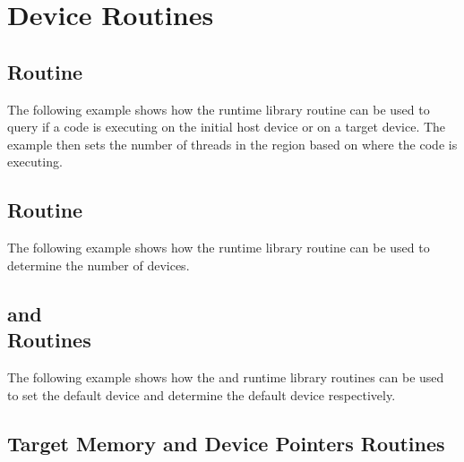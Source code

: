 \pagebreak
\section{Device Routines}
\label{sec:device}

\subsection{ Routine}
\label{subsec:device_is_initial}

The following example shows how the  runtime library routine 
can be used to query if a code is executing on the initial host device or on a 
target device. The example then sets the number of threads in the  
region based on where the code is executing.



\subsection{ Routine}
\label{subsec:device_num_devices}

The following example shows how the  runtime library routine 
can be used to determine the number of devices.



\subsection{ and \\
 Routines}
\label{subsec:device_is_set_get_default}

The following example shows how the  and  
runtime library routines can be used to set the default device and determine the 
default device respectively.




 \subsection{Target Memory and Device Pointers Routines}
\label{subsec:target_mem_and_device_ptrs}

